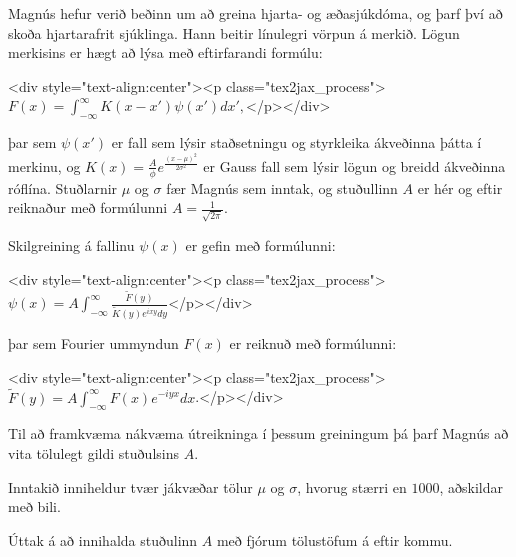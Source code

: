
Magnús hefur verið beðinn um að greina hjarta- og æðasjúkdóma, og þarf því að
skoða hjartarafrit sjúklinga. Hann beitir línulegri vörpun á merkið. Lögun
merkisins er hægt að lýsa með eftirfarandi formúlu:

<div style="text-align:center"><p class="tex2jax_process">$F(x) = \int_{-\infty}^{\infty} K (x - x') \psi(x')dx',$</p></div>

þar sem $\psi(x')$ er fall sem lýsir staðsetningu og styrkleika ákveðinna þátta
í merkinu, og $K(x) = \frac{A}{\phi} e^{\frac{(x-\mu)^2}{2\sigma^2}}$ er Gauss
fall sem lýsir lögun og breidd ákveðinna róflína. Stuðlarnir $\mu$ og $\sigma$
fær Magnús sem inntak, og stuðullinn $A$ er hér og eftir reiknaður með
formúlunni $A = \frac{1}{\sqrt{2\pi}}$.

Skilgreining á fallinu $\psi(x)$ er gefin með formúlunni:

<div style="text-align:center"><p class="tex2jax_process">$\psi(x) = A\int_{-\infty}^{\infty} \frac{\tilde{F}(y)}{\tilde{K}(y)e^{ixy}dy}$</p></div>

þar sem Fourier ummyndun $F(x)$ er reiknuð með formúlunni:

<div style="text-align:center"><p class="tex2jax_process">$\tilde{F}(y) = A\int_{-\infty}^{\infty} F(x) e^{-iyx}dx$.</p></div>

Til að framkvæma nákvæma útreikninga í þessum greiningum þá þarf Magnús að vita
tölulegt gildi stuðulsins $A$.

Inntakið inniheldur tvær jákvæðar tölur $\mu$ og $\sigma$, hvorug stærri en $1000$, aðskildar með bili.

Úttak á að innihalda stuðulinn $A$ með fjórum tölustöfum á eftir kommu.

